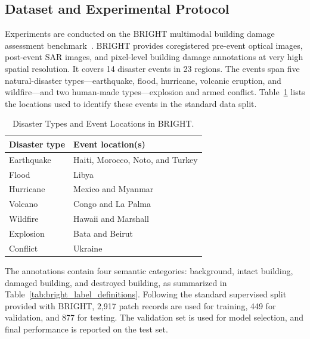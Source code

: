 \documentclass[journal]{IEEEtran}
\begin{document}
    \subsection{Dataset and Experimental Protocol}
    \label{subsec:dataset_protocol}
    
    Experiments are conducted on the BRIGHT multimodal building damage assessment benchmark~\cite{chen2025bright}. BRIGHT provides coregistered pre-event optical images, post-event SAR images, and pixel-level building damage annotations at very high spatial resolution. It covers 14 disaster events in 23 regions. The events span five natural-disaster types---earthquake, flood, hurricane, volcanic eruption, and wildfire---and two human-made types---explosion and armed conflict. Table~\ref{tab:bright_events} lists the locations used to identify these events in the standard data split.
    
    \begin{table}[!t]
    \caption{Disaster Types and Event Locations in BRIGHT.}
    \label{tab:bright_events}
    \centering
    \footnotesize
    \setlength{\tabcolsep}{3pt}
    \renewcommand{\arraystretch}{1.08}
    \begin{tabular}{>{\raggedright\arraybackslash}p{}
                    >{\raggedright\arraybackslash}p{}}
    \toprule
    Disaster type & Event location(s) \\
    \midrule
    Earthquake & Haiti, Morocco, Noto, and Turkey \\
    Flood & Libya \\
    Hurricane & Mexico and Myanmar \\
    Volcano & Congo and La Palma \\
    Wildfire & Hawaii and Marshall \\
    Explosion & Bata and Beirut \\
    Conflict & Ukraine \\
    \bottomrule
    \end{tabular}
    \renewcommand{\arraystretch}{1.0}
    \end{table}
    
    The annotations contain four semantic categories: background, intact building, damaged building, and destroyed building, as summarized in Table~\ref{tab:bright_label_definitions}. Following the standard supervised split provided with BRIGHT, 2,917 patch records are used for training, 449 for validation, and 877 for testing. The validation set is used for model selection, and final performance is reported on the test set.
    
\end{document}
